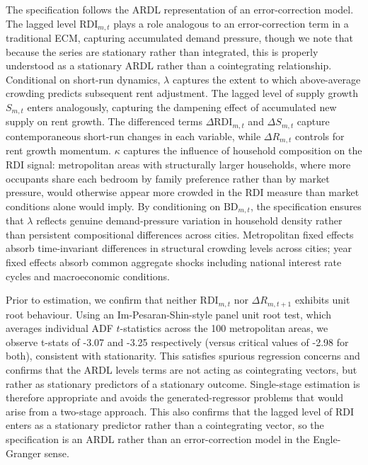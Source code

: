 \documentclass[pdflatex,sn-basic]{sn-jnl}%
\theoremstyle{thmstyleone}%
\theoremstyle{thmstyletwo}%
\theoremstyle{thmstylethree}%
\begin{document}
The specification follows the ARDL representation of an error-correction model.
The lagged level $\text{RDI}_{m,t}$ plays a role analogous to an error-correction
term in a traditional ECM, capturing accumulated demand pressure, though we
note that because the series are stationary rather than integrated, this is properly
understood as a stationary ARDL rather than a cointegrating relationship.
Conditional on short-run dynamics, $\lambda$ captures the extent to which
above-average crowding predicts subsequent rent adjustment. The lagged level of
supply growth $S_{m,t}$ enters analogously, capturing the dampening effect of
accumulated new supply on rent growth. The differenced terms $\Delta\text{RDI}_{m,t}$
and $\Delta S_{m,t}$ capture contemporaneous short-run changes in each variable,
while $\Delta R_{m,t}$ controls for rent growth momentum. $\kappa$ captures the
influence of household composition on the RDI signal: metropolitan areas with
structurally larger households, where more occupants share each bedroom by family
preference rather than by market pressure, would otherwise appear more crowded
in the RDI measure than market conditions alone would imply. By conditioning on
$\text{BD}_{m,t}$, the specification ensures that $\lambda$ reflects genuine
demand-pressure variation in household density rather than persistent compositional
differences across cities. Metropolitan fixed effects absorb time-invariant
differences in structural crowding levels across cities; year fixed effects absorb
common aggregate shocks including national interest rate cycles and macroeconomic
conditions.

Prior to estimation, we confirm that neither $\text{RDI}_{m,t}$ nor 
$\Delta R_{m,t+1}$ exhibits unit root behaviour. Using an Im-Pesaran-Shin-style 
panel unit root test, which averages individual ADF $t$-statistics across the 100 
metropolitan areas, we observe t-stats of -3.07 and -3.25 respectively (versus critical values of -2.98 for both), consistent with stationarity. This satisfies 
spurious regression concerns and confirms that the ARDL levels terms are not 
acting as cointegrating vectors, but rather as stationary predictors of a 
stationary outcome. Single-stage estimation is therefore appropriate and avoids 
the generated-regressor problems that would arise from a two-stage approach. This also confirms that the lagged level of RDI enters as a stationary predictor rather than a cointegrating vector, so the specification is an ARDL rather than an error-correction model in the Engle-Granger sense.
\end{document}
